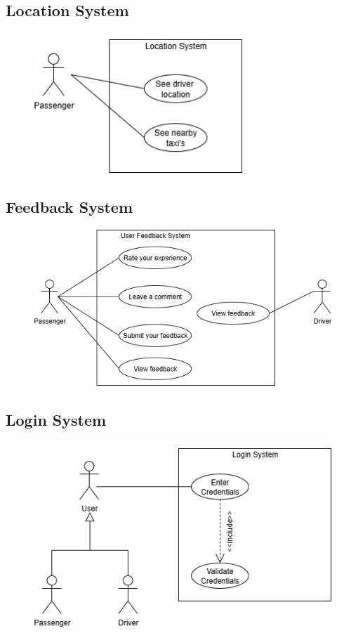 \documentclass[a4paper,12pt]{article}
\begin{document}
    \subsection*{Location System}
    \begin{figure}[H]
      \centering
      \includegraphics[width=0.7\textwidth]{Location System.png} 
    \end{figure}
   
  \subsection*{Feedback System}
    \begin{figure}[H]
      \centering
      \includegraphics[width=1\textwidth]{Feedback.png} 
    \end{figure}
  \subsection*{Login System}
    \begin{figure}[H]
      \centering
      \includegraphics[width=1\textwidth]{Login System.png} 
    \end{figure}
\end{document}
